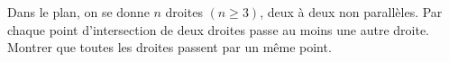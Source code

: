 Dans le plan, on se donne $n$ droites $(n \geq 3)$, deux à deux non parallèles. Par chaque point d'intersection de deux droites passe au moins une autre droite. Montrer que toutes les droites passent par un même point.
